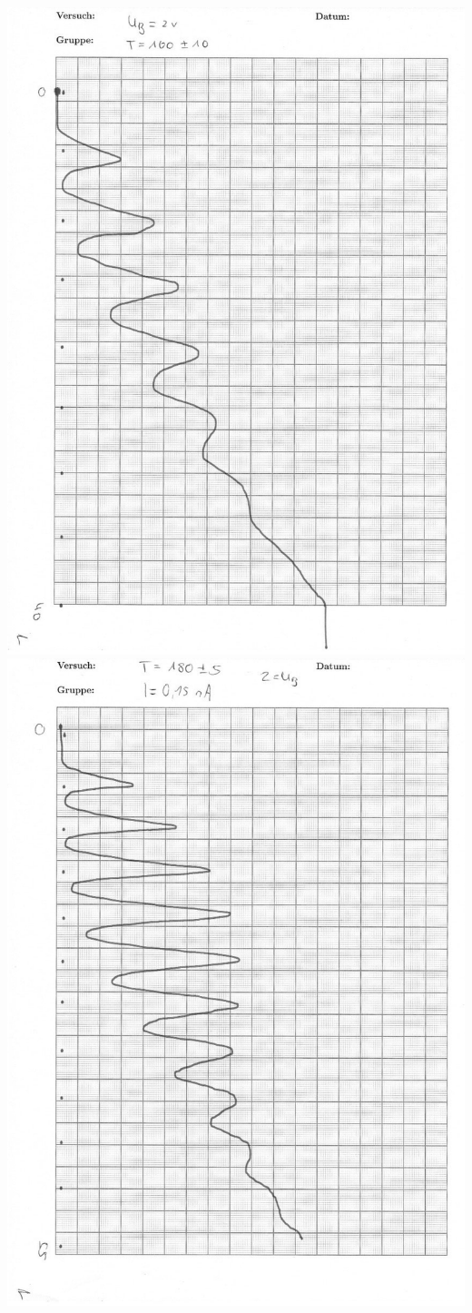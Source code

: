 \vfill\null
\newpage
\null\vfill
\includegraphics[width=0.9\linewidth]{content/messung/anhang/4b.jpg}
\vfill\null
\newpage
\null\vfill
\includegraphics[width=0.9\linewidth]{content/messung/anhang/5.jpg}
